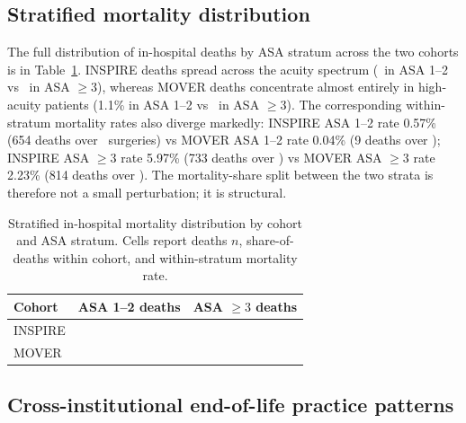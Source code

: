 \documentclass[11pt,a4paper]{article}
\providecommand{\bomark}{\bottomrule}
\begin{document}
\subsection{Stratified mortality distribution}\label{supp:s7-stratified-mortality}

The full distribution of in-hospital deaths by ASA stratum across the two
cohorts is in Table~\ref{tab:s7-stratified-mortality}. INSPIRE deaths
spread across the acuity spectrum (\pnTableOneDeathsAsaOneTwoPctInspire\
in ASA 1--2 vs \pnTableOneDeathsAsaThreePlusPctInspire\ in ASA $\geq 3$),
whereas MOVER deaths concentrate almost entirely in high-acuity patients
(1.1\% in ASA 1--2 vs \pnTableOneDeathsAsaThreePlusPctMover\ in ASA
$\geq 3$). The corresponding within-stratum mortality rates also diverge
markedly: INSPIRE ASA 1--2 rate 0.57\% (654 deaths over
\pnTableOneAsaOneTwoInspire\ surgeries) vs MOVER ASA 1--2 rate 0.04\% (9
deaths over \pnTableOneAsaOneTwoMover); INSPIRE ASA $\geq 3$ rate 5.97\%
(733 deaths over \pnTableOneAsaThreePlusInspire) vs MOVER ASA $\geq 3$
rate 2.23\% (814 deaths over \pnTableOneAsaThreePlusMover). The
mortality-share split between the two strata is therefore not a small
perturbation; it is structural.

\begin{table}[H]
\centering
\caption{Stratified in-hospital mortality distribution by cohort and ASA
stratum. Cells report deaths $n$, share-of-deaths within cohort, and
within-stratum mortality rate.}
\label{tab:s7-stratified-mortality}
\setlength{\tabcolsep}{6pt}
\begin{tabular}{lll}
\toprule
\textbf{Cohort} & \textbf{ASA 1--2 deaths} & \textbf{ASA $\geq 3$ deaths} \\
\midrule
INSPIRE & \pnTableOneDeathsAsaOneTwoInspire & \pnTableOneDeathsAsaThreePlusInspire \\
MOVER  & \pnTableOneDeathsAsaOneTwoMover  & \pnTableOneDeathsAsaThreePlusMover \\
\bomark
\end{tabular}
\end{table}

\subsection{Cross-institutional end-of-life practice patterns}\label{supp:s7-eol-practice}
\end{document}
